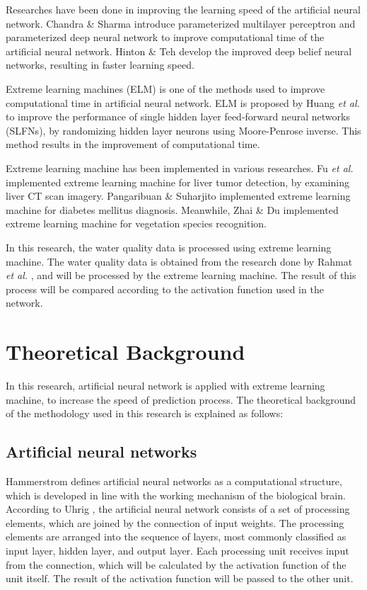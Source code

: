 \documentclass[journal,comsoc]{IEEEtran}
\begin{document}
Researches have been done in improving the learning speed of the artificial neural network. Chandra \& Sharma introduce parameterized multilayer perceptron \cite{Chandra14} and parameterized deep neural network \cite{Chandra16} to improve computational time of the artificial neural network. Hinton \& Teh \cite{Hinton06} develop the improved deep belief neural networks, resulting in faster learning speed.

Extreme learning machines (ELM) is one of the methods used to improve computational time in artificial neural network. ELM is proposed by Huang \textit{et al.} \cite{Huang06} to improve the performance of single hidden layer feed-forward neural networks (SLFNs), by randomizing hidden layer neurons using Moore-Penrose inverse. This method results in the improvement of computational time.

Extreme learning machine has been implemented in various researches. Fu \textit{et al.} \cite{Fu15} implemented extreme learning machine for liver tumor detection, by examining liver CT scan imagery. Pangaribuan \& Suharjito \cite{Pangaribuan14} implemented extreme learning machine for diabetes mellitus diagnosis. Meanwhile, Zhai \& Du \cite{Zhai08} implemented extreme learning machine for vegetation species recognition.

In this research, the water quality data is processed using extreme learning machine. The water quality data is obtained from the research done by Rahmat \textit{et al.} \cite{Rahmat16}, and will be processed by the extreme learning machine. The result of this process will be compared according to the activation function used in the network.

\section{Theoretical Background}

In this research, artificial neural network is applied with extreme learning machine, to increase the speed of prediction process. The theoretical background of the methodology used in this research is explained as follows:

\subsection{Artificial neural networks}

Hammerstrom \cite{Hammerstrom93} defines artificial neural networks as a computational structure, which is developed in line with the working mechanism of the biological brain. According to Uhrig \cite{Uhrig95}, the artificial neural network consists of a set of processing elements, which are joined by the connection of input weights. The processing elements are arranged into the sequence of layers, most commonly classified as input layer, hidden layer, and output layer. Each processing unit receives input from the connection, which will be calculated by the activation function of the unit itself. The result of the activation function will be passed to the other unit.
\end{document}
